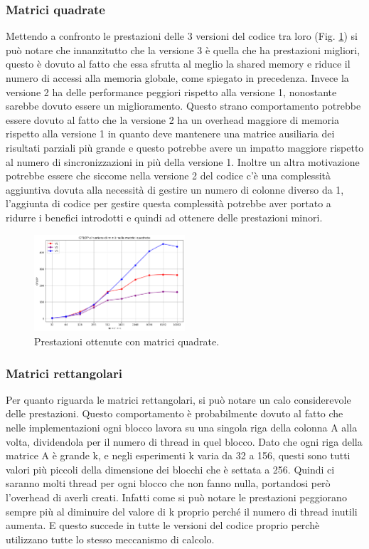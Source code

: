 \documentclass[conference]{IEEEtran}
\begin{document}
\subsubsection{Matrici quadrate}
Mettendo a confronto le prestazioni delle 3 versioni del codice tra loro (Fig. \ref{fig:square_matrix}) si può notare che innanzitutto che la versione 3 è quella che ha prestazioni migliori, questo è dovuto al fatto che essa sfrutta al meglio la shared memory e riduce il numero di accessi alla memoria globale, come spiegato in precedenza. 
Invece la versione 2 ha delle performance peggiori rispetto alla versione 1, nonostante sarebbe dovuto essere un miglioramento. 
Questo strano comportamento potrebbe essere dovuto al fatto che la versione 2 ha un overhead maggiore di memoria rispetto alla versione 1 in quanto deve mantenere una matrice ausiliaria dei risultati parziali più grande e questo potrebbe avere un impatto maggiore rispetto al numero di sincronizzazioni in più della versione 1. Inoltre un altra motivazione potrebbe essere che siccome nella versione 2 del codice c'è una complessità aggiuntiva dovuta alla necessità di gestire un numero di colonne diverso da 1, l'aggiunta di codice per gestire questa complessità potrebbe aver portato a ridurre i benefici introdotti e quindi ad ottenere delle prestazioni minori.\\
\begin{figure}[H]
    \centering
    \includegraphics[width=0.5\textwidth]{resources/gpu_matrix_square.png}
    \caption{Prestazioni ottenute con matrici quadrate.}
    \label{fig:square_matrix}
\end{figure}
\subsubsection{Matrici rettangolari}
Per quanto riguarda le matrici rettangolari, si può notare un calo considerevole delle prestazioni. Questo comportamento è probabilmente dovuto al fatto che nelle implementazioni ogni blocco lavora su una singola riga della colonna A alla volta, dividendola per il numero di thread in quel blocco. Dato che ogni riga della matrice A è grande k, e negli esperimenti k varia da 32 a 156, questi sono tutti valori più piccoli della dimensione dei blocchi che è settata a 256. Quindi ci saranno molti thread per ogni blocco che non fanno nulla, portandosi però l'overhead di averli creati. Infatti come si può notare le prestazioni peggiorano sempre più al diminuire del valore di k proprio perché il numero di thread inutili aumenta. E questo succede in tutte le versioni del codice proprio perchè utilizzano tutte lo stesso meccanismo di calcolo.\\
\end{document}
